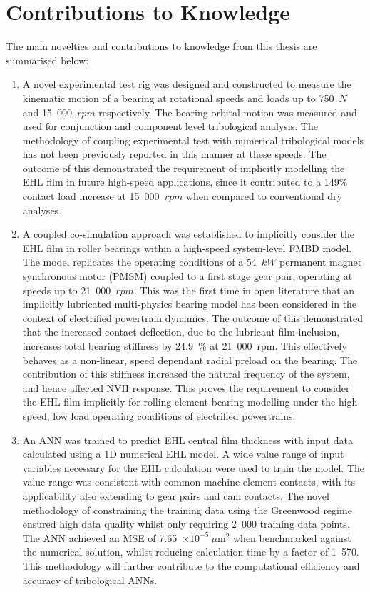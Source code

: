 \section{Contributions to Knowledge} \label{Contribution to Knowledge}

The main novelties and contributions to knowledge from this thesis are summarised below:

\begin{enumerate}
	\item A novel experimental test rig was designed and constructed to measure the kinematic motion of a bearing at rotational speeds and loads up to 750~$N$ and 15~000~$rpm$ respectively. The bearing orbital motion was measured and used for conjunction and component level tribological analysis. The methodology of coupling experimental test with numerical tribological models has not been previously reported in this manner at these speeds. The outcome of this demonstrated the requirement of implicitly modelling the EHL film in future high-speed applications, since it contributed to a 149\% contact load increase at 15~000~$rpm$ when compared to conventional dry analyses.
	
	\item A coupled co-simulation approach was established to implicitly consider the EHL film in roller bearings within a high-speed system-level FMBD model. The model replicates the operating conditions of a 54~$kW$ permanent magnet synchronous motor (PMSM) coupled to a first stage gear pair, operating at speeds up to 21~000~$rpm$. This was the first time in open literature that an implicitly lubricated multi-physics bearing model has been considered in the context of electrified powertrain dynamics. The outcome of this demonstrated that the increased contact deflection, due to the lubricant film inclusion, increases total bearing stiffness by 24.9~\% at 21~000~rpm. This effectively behaves as a non-linear, speed dependant radial preload on the bearing. The contribution of this stiffness increased the natural frequency of the system, and hence affected NVH response. This proves the requirement to consider the EHL film implicitly for rolling element bearing modelling under the high speed, low load operating conditions of electrified powertrains.
	
	\item An ANN was trained to predict EHL central film thickness with input data calculated using a 1D numerical EHL model. A wide value range of input variables necessary for the EHL calculation were used to train the model. The value range was consistent with common machine element contacts, with its applicability also extending to gear pairs and cam contacts. The novel methodology of constraining the training data using the Greenwood regime ensured high data quality whilst only requiring 2~000 training data points. The ANN achieved an MSE of 7.65~$\times 10^{-5}~\mu \mathrm{m}^2$ when benchmarked against the numerical solution, whilst reducing calculation time by a factor of 1~570. This methodology will further contribute to the computational efficiency and accuracy of tribological ANNs.
	

\end{enumerate}
